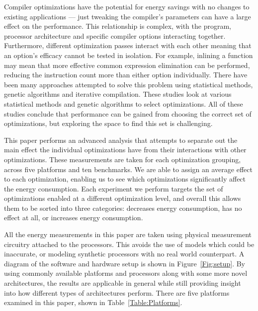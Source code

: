 \documentclass[twocolumn]{article}
\newcommand{\todo}[1]{\textbf{\textcolor{red}{#1}}}
\begin{document}

Compiler optimizations have the potential for energy savings with no changes to existing applications --- just tweaking the compiler's parameters can have a large effect on the performance. This relationship is complex, with the program, processor architecture and specific compiler options interacting together. Furthermore, different optimization passes interact with each other meaning that an option's efficacy cannot be tested in isolation. For example, inlining a function may mean that more effective common expression elimination can be performed, reducing the instruction count more than either option individually. There have been many approaches attempted to solve this problem using statistical methods\cite{Haneda2005}, genetic algorithms\cite{Lin2008} and iterative compilation\cite{Kisuki1999}. These studies look at various statistical methods and genetic algorithms to select optimizations. All of these studies conclude that performance can be gained from choosing the correct set of optimizations, but exploring the space to find this set is challenging.

This paper performs an advanced analysis that attempts to separate out the main effect the individual optimizations have from their interactions with other optimizations. These measurements are taken for each optimization grouping, across five platforms and ten benchmarks. We are able to assign an average effect to each optimization, enabling us to see which optimizations significantly affect the energy consumption. Each experiment we perform targets the set of optimizations enabled at a different optimization level, and overall this allows them to be sorted into three categories: decreases energy consumption, has no effect at all, or increases energy consumption.

All the energy measurements in this paper are taken using physical measurement circuitry attached to the processors. This avoids the use of models which could be inaccurate, or modeling synthetic processors with no real world counterpart. A diagram of the software and hardware setup is shown in Figure~\ref{Fig:setup}. By using commonly available platforms and processors along with some more novel architectures, the results are applicable in general while still providing insight into how different types of architectures perform. There are five platforms examined in this paper, shown in Table~\ref{Table:Platforms}.
\end{document}
